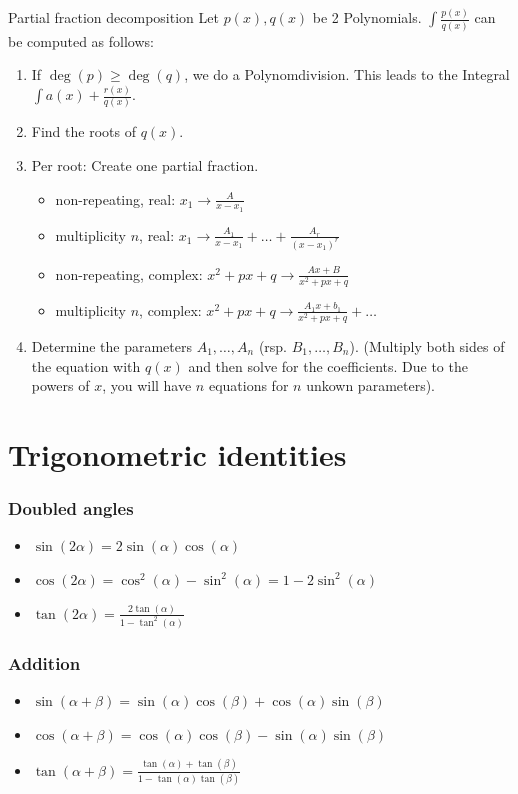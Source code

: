 \documentclass[a4paper,fontsize = 10pt]{article}
\begin{document}
\begin{mainbox}{Partial fraction decomposition}
 Let $p(x), q(x)$ be 2 Polynomials. $\int \frac{p(x)}{q(x)}$ can be computed as follows:
 \begin{enumerate}
  \item If $\deg(p) \ge \deg(q)$, we do a Polynomdivision. This leads to the Integral $\int a(x) + \frac{r(x)}{q(x)}$.
  \item Find the roots of $q(x)$.
  \item Per root: Create one partial fraction.
  \begin{itemize}[left=0pt]
   \item non-repeating, real: $x_1 \to \frac{A}{x - x_1}$
   \item multiplicity $n$, real: $x_1 \to \frac{A_1}{x - x_1} + \ldots + \frac{A_r}{(x-x_1)^r}$ 
   \item non-repeating, complex: $x^2 + px + q \to \frac{Ax + B} {x^2 + px + q}$
   \item multiplicity $n$, complex: $x^2 + px + q \to \frac{A_1x+b_1}{x^2+px+q} + \ldots$
  \end{itemize}
  \item Determine the parameters $A_1, \ldots, A_n$ (rsp. $B_1, \ldots, B_n$). 
  (Multiply both sides of the equation with $q(x)$ and then solve for the coefficients. Due to the powers of $x$, you will have $n$ equations for $n$ unkown parameters).

 \end{enumerate}
\end{mainbox}

\section{Trigonometric identities}

\subsubsection*{Doubled angles}
\begin{itemize}
 \item $\sin(2\alpha) = 2 \sin(\alpha) \cos(\alpha)$
 \item $\cos(2\alpha) = \cos^2(\alpha) - \sin^2(\alpha) = 1 - 2 \sin^2(\alpha)$
 \item $\tan(2\alpha) = \frac{2\tan(\alpha)}{1 - \tan^2(\alpha)}$
\end{itemize}

\subsubsection*{Addition}
\begin{itemize}
 \item $\sin(\alpha + \beta) = \sin(\alpha) \cos(\beta) + \cos(\alpha) \sin(\beta)$
 \item $\cos(\alpha + \beta) = \cos(\alpha) \cos(\beta) - \sin(\alpha) \sin(\beta)$
 \item $\tan(\alpha + \beta) = \frac{\tan(\alpha) + \tan(\beta)}{1 - \tan(\alpha) \tan(\beta)}$
\end{itemize}
\end{document}
